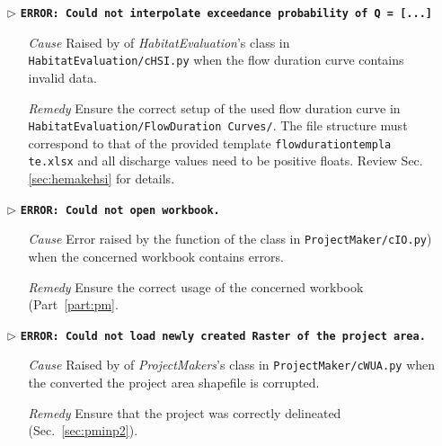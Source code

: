 \begin{itemize}
	\item[$\triangleright$]\textbf{\texttt{ERROR: Could not interpolate exceedance probability of Q =  [...]}}
	\begin{itemize}
		\item[\textit{Cause}\hspace{0.27cm}] Raised by  of \textit{HabitatEvaluation}'s  class in \texttt{HabitatEvaluation/cHSI.py} when the flow duration curve contains invalid data.
		\item[\textit{Remedy}] Ensure the correct setup of the used flow duration curve in \texttt{HabitatEvaluation/FlowDuration Curves/}. The file structure must correspond to that of the provided template \texttt{flow{\myUnderscore}duration{\myUnderscore}templa te.xlsx} and all discharge values need to be positive floats. Review Sec. \ref{sec:hemakehsi} for details.\\
	\end{itemize}
	
	\item[$\triangleright$]\textbf{\texttt{ERROR: Could not open workbook.}}
	\begin{itemize}
		\item[\textit{Cause}\hspace{0.27cm}] Error raised by the  function of the  class in \texttt{ProjectMaker/cIO.py}) when the concerned workbook contains errors.
		\item[\textit{Remedy}] Ensure the correct usage of the concerned workbook (Part~\ref{part:pm}.\\
	\end{itemize}
	
	\item[$\triangleright$]\textbf{\texttt{ERROR: Could not load newly created Raster of the project area.}}
	\begin{itemize}
		\item[\textit{Cause}\hspace{0.27cm}] Raised by  of \textit{ProjectMakers}'s  class in \texttt{ProjectMaker/cWUA.py} when the converted the project area shapefile is corrupted.
		\item[\textit{Remedy}] Ensure that the project was correctly delineated (Sec.~\ref{sec:pminp2}).\\
	\end{itemize}
	

\end{itemize}
